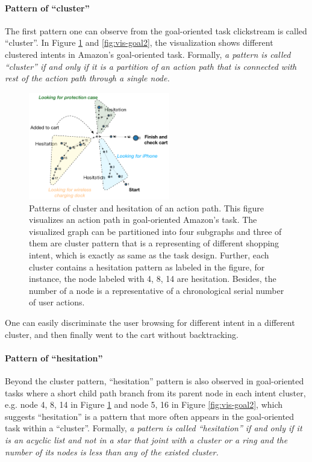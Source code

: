\paragraph{Pattern of ``cluster''}
The first pattern one can observe from the goal-oriented task clickstream is called ``cluster''.
In Figure \ref{fig:vis-goal1} and \ref{fig:vis-goal2}, 
the visualization shows different clustered intents in Amazon's goal-oriented task. 
Formally, \emph{a pattern is called ``cluster'' if and only if it is a partition of an action path
that is connected with rest of the action path through a single node.}

\begin{figure}[H]
    \centering
    \includegraphics[width=0.55\textwidth]{figures/vis-goal1}
    \caption{Patterns of cluster and hesitation of an action path. This figure visualizes an action path in
    goal-oriented Amazon's task. The visualized graph can be partitioned into four subgraphs and three of them are cluster pattern that is a representing of different shopping intent, 
    which is exactly as same as the task design. Further, each cluster contains a hesitation pattern as labeled in the figure, for instance, the node labeled with 4, 8, 14 are hesitation. 
    Besides, the number of a node is a representative of a chronological serial number of user actions.}
    \label{fig:vis-goal1}
\end{figure}

One can easily discriminate the user browsing for 
different intent in a different cluster, and then finally went to the cart without
backtracking.

\paragraph{Pattern of ``hesitation''}
Beyond the cluster pattern, ``hesitation'' pattern is also observed in goal-oriented tasks
where a short child path branch from its parent node in each intent cluster, e.g. node
4, 8, 14 in Figure \ref{fig:vis-goal1} and node 5, 16 in Figure \ref{fig:vis-goal2},
which suggests ``hesitation'' is a pattern that more often appears in the goal-oriented task
within a ``cluster''. Formally, \emph{a pattern is called ``hesitation'' if and only if it
is an acyclic list and not in a star that joint with a cluster or a ring and the number of its nodes is less than any 
of the existed cluster.}

